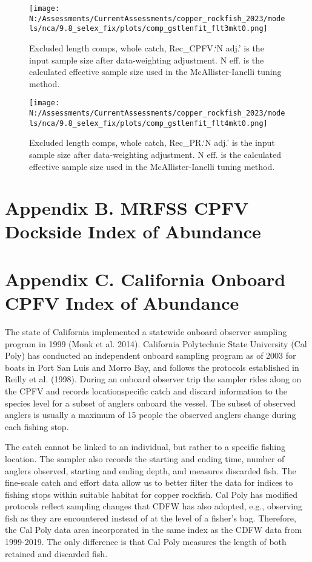 \documentclass[11pt,
  english,
  letterpaper,
]{article}
\begin{document}
\begin{figure}
\centering
\texttt{[image: N:/Assessments/CurrentAssessments/copper\_rockfish\_2023/models/nca/9.8\_selex\_fix/plots/comp\_gstlenfit\_flt3mkt0.png]}
\caption{Excluded length comps, whole catch, Rec\_CPFV.`N adj.' is the input sample size after data-weighting adjustment. N eff. is the calculated effective sample size used in the McAllister-Ianelli tuning method.\label{fig:comp_gstlenfit_flt3mkt0}}
\end{figure}

\begin{figure}
\centering
\texttt{[image: N:/Assessments/CurrentAssessments/copper\_rockfish\_2023/models/nca/9.8\_selex\_fix/plots/comp\_gstlenfit\_flt4mkt0.png]}
\caption{Excluded length comps, whole catch, Rec\_PR.`N adj.' is the input sample size after data-weighting adjustment. N eff. is the calculated effective sample size used in the McAllister-Ianelli tuning method.\label{fig:comp_gstlenfit_flt4mkt0}}
\end{figure}

\newpage

\hypertarget{mrfss-cpfv-index}{%
\section{Appendix B. MRFSS CPFV Dockside Index of Abundance}\label{mrfss-cpfv-index}}

\hypertarget{onboard-cpfv-index}{%
\section{Appendix C. California Onboard CPFV Index of Abundance}\label{onboard-cpfv-index}}

The state of California implemented a statewide onboard observer sampling program in 1999 (Monk et al. 2014). California Polytechnic State University (Cal Poly) has conducted an independent onboard sampling program as of 2003 for boats in Port San Luis and Morro Bay, and follows the protocols established in Reilly et al. (1998). During an onboard observer trip the sampler rides along on the CPFV and records locationspecific catch and discard information to the species level for a subset of anglers onboard the vessel. The subset of observed anglers is usually a maximum of 15 people the observed anglers change during each fishing stop.

The catch cannot be linked to an individual, but rather to a specific fishing location. The sampler also records the starting and ending time, number of anglers observed, starting and ending depth, and measures discarded fish. The fine-scale catch and effort data allow us to better filter the data for indices to fishing stops within suitable habitat for copper rockfish. Cal Poly has modified protocols reflect sampling changes that CDFW has also adopted, e.g., observing fish as they are encountered instead of at the level of a fisher's bag. Therefore, the Cal Poly data area incorporated in the same index as the CDFW data from 1999-2019. The only difference is that Cal Poly measures the length of both retained and discarded fish.
\end{document}
